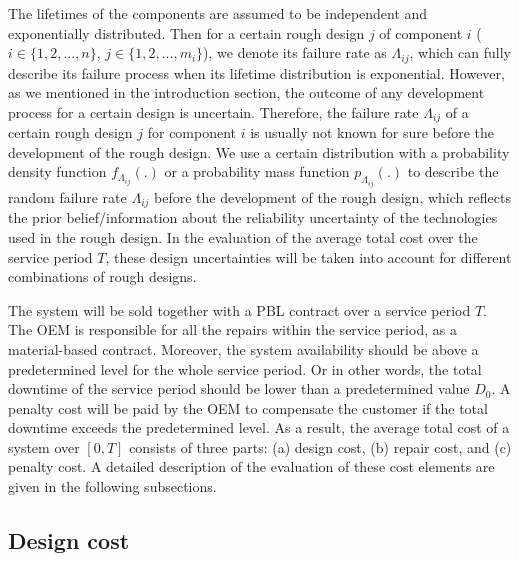 \documentclass[preprint,12pt]{elsarticle}
\begin{document}
The lifetimes of the components are assumed to be independent and exponentially distributed. Then for a certain rough design $j$ of component $i$ ($i \in \{1,2,...,n\}$, $j \in \{1,2,...,m_i\}$), we denote its failure rate as $\Lambda_{ij}$, which can fully describe its failure process when its lifetime distribution is exponential. However, as we mentioned in the introduction section, the outcome of any development process for a certain design is uncertain. Therefore, the failure rate $\Lambda_{ij}$ of a certain rough design $j$ for component $i$ is usually not known for sure before the development of the rough design. We use a certain distribution with a probability density function $f_{\Lambda_{ij}}(.)$ or a probability mass function $p_{\Lambda_{ij}}(.)$ to describe the random failure rate $\Lambda_{ij}$ before the development of the rough design, which reflects the prior belief/information about the reliability uncertainty of the technologies used in the rough design. In the evaluation of the average total cost over the service period $T$, these design uncertainties will be taken into account for different combinations of rough designs.

The system will be sold together with a PBL contract over a service period $T$. The OEM is responsible for all the repairs within the service period, as a material-based contract. Moreover, the system availability should be above a predetermined level for the whole service period. Or in other words, the total downtime of the service period should be lower than a predetermined value $D_0$. A penalty cost will be paid by the OEM to compensate the customer if the total downtime exceeds the predetermined level. As a result, the average total cost of a system over $[0, T]$ consists of three parts: (a) design cost, (b) repair cost, and (c) penalty cost. A detailed description of the evaluation of these cost elements are given in the following subsections.



\subsection{Design cost}
	
\end{document}
